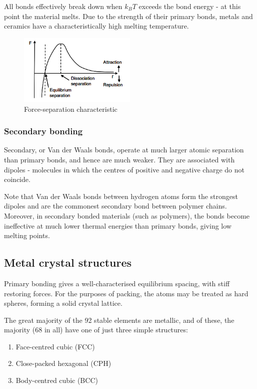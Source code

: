 \documentclass{article}
\begin{document}
All bonds effectively break down when $k_BT$ exceeds the bond energy - at this point the material melts. Due to the strength of their primary bonds, metals and ceramics have a characteristically high melting temperature.

\begin{figure}[ht!]
    \centering
    \includegraphics[width = 0.5\textwidth]{images/bond1.png}
    \caption{Force-separation characteristic}
    \label{fig:enter-label}
\end{figure}

\subsubsection{Secondary bonding}

Secondary, or Van der Waals bonds, operate at much larger atomic separation than primary bonds, and hence are much weaker. They are associated with dipoles - molecules in which the centres of positive and negative charge do not coincide.

Note that Van der Waals bonds between hydrogen atoms form the strongest dipoles and are the commonest secondary bond between polymer chains. Moreover, in secondary bonded materials (such as polymers), the bonds become ineffective at much lower thermal energies than primary bonds, giving low melting points.

\newpage

\subsection{Metal crystal structures}

Primary bonding gives a well-characterised equilibrium spacing, with stiff restoring forces. For the
purposes of packing, the atoms may be treated as hard spheres, forming a solid crystal lattice.

The great majority of the 92 stable elements are metallic, and of these, the majority (68 in all) have one of
just three simple structures: 

\begin{enumerate}
    \item Face-centred cubic (FCC)
    \item Close-packed hexagonal (CPH)
    \item Body-centred cubic (BCC)
\end{enumerate}
\end{document}
